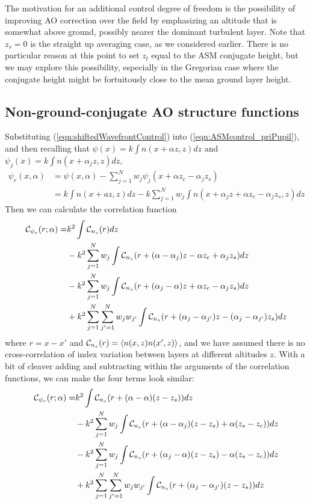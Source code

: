 \documentclass[11pt, oneside]{article}   	%
\begin{document}
The motivation for an additional control degree of freedom is the possibility of improving AO correction over the field by emphasizing an altitude that is somewhat above ground, possibly nearer the dominant turbulent layer. Note that $z_s=0$ is the straight up averaging case, as we considered earlier. There is no particular reason at this point to set $z_l$ equal to the ASM conjugate height, but we may explore this possibility, especially in the Gregorian case where the conjugate height might be fortuitously close to the mean ground layer height.

\subsection{Non-ground-conjugate AO structure functions}
Substituting  (\ref{eqn:shiftedWavefrontControl}) into (\ref{eqn:ASMcontrol_priPupil}), and then recalling that $\psi(x) = k\int n(x+\alpha z,z) dz$ and $\psi_j(x) = k\int n(x+\alpha_j z,z) dz$,
\begin{align}
\psi_r(x,\alpha) &= \psi(x,\alpha) - \sum_{j=1}^N w_j \psi_j(x+\alpha z_c -\alpha_j z_s) \nonumber \\
&= k \int n(x+az,z) dz - k \sum_{j=1}^N w_j \int n(x+\alpha_j z+\alpha z_c-\alpha_j z_s,z) dz
\end{align}
Then we can calculate the correlation function
\begin{align}
{\cal C}_{\psi_r}(r;\alpha) = &k^2 \int {\cal C}_{n_z}(r) dz \nonumber \\
                                            &- k^2\sum_{j=1}^N w_j \int{\cal C}_{n_z}(r+(\alpha-\alpha_j)z-\alpha z_c+\alpha_j z_s)dz \nonumber \\
                                             & - k^2\sum_{j=1}^N w_j \int{\cal C}_{n_z}(r+(\alpha_j-\alpha)z+\alpha z_c-\alpha_j z_s)dz \nonumber \\
            & + k^2\sum_{j=1}^N\sum_{j'=1}^N w_j w_{j'} \int{\cal C}_{n_z}(r+(\alpha_j-\alpha_{j'})z -(\alpha_j-\alpha_{j'})z_s)dz
\end{align}
where $r = x-x'$ and ${\cal C}_{n_z}(r) = \left\langle n(x,z)n(x',z) \right\rangle$, and we have assumed there is no cross-correlation of index variation between layers at different altitudes $z$. With a bit of cleaver adding and subtracting within the arguments of the correlation functions, we can make the four terms look similar:
\begin{align}
{\cal C}_{\psi_r}(r;\alpha) = &k^2 \int {\cal C}_{n_z}(r+(\alpha-\alpha)(z-z_s)) dz \nonumber \\
                                            &- k^2\sum_{j=1}^N w_j \int{\cal C}_{n_z}(r+(\alpha-\alpha_j)(z-z_s) + \alpha (z_s - z_c))dz \nonumber \\
                                             & - k^2\sum_{j=1}^N w_j \int{\cal C}_{n_z}(r+(\alpha_j-\alpha)(z-z_s)-\alpha (z_s - z_c))dz \nonumber \\
            & + k^2\sum_{j=1}^N\sum_{j'=1}^N w_j w_{j'} \int{\cal C}_{n_z}(r+(\alpha_j-\alpha_{j'})(z-z_s))dz
\end{align}
\end{document}
